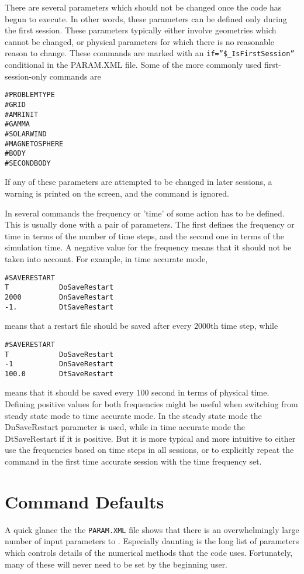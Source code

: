 There are several parameters which should not be changed once the code 
has begun to execute.  
In other words, these parameters can be defined only during the first
session.  These parameters typically either involve geometries which 
cannot be changed, or physical parameters for which there is no reasonable 
reason to change. These commands are marked with an 
{\tt if=''\$\_IsFirstSession''} conditional in the PARAM.XML file.
Some of the more commonly used first-session-only commands are
\begin{verbatim}
#PROBLEMTYPE 
#GRID 
#AMRINIT
#GAMMA
#SOLARWIND
#MAGNETOSPHERE
#BODY
#SECONDBODY
\end{verbatim}
If any of these parameters are attempted to be changed in later sessions, 
a warning is printed on the screen, and the command is ignored.

In several commands the frequency or 'time' of some action has
to be defined. This is usually done with a pair of parameters.
The first defines the frequency or time in terms of the number of time steps,
and the second one in terms of the simulation time.
A negative value for the frequency means that it should not be taken 
into account. For example, in time accurate mode,
\begin{verbatim}
#SAVERESTART
T            DoSaveRestart
2000         DnSaveRestart
-1.          DtSaveRestart
\end{verbatim}
means that a restart file should be saved after every 2000th time step, while
\begin{verbatim}
#SAVERESTART
T            DoSaveRestart
-1           DnSaveRestart
100.0        DtSaveRestart
\end{verbatim}
means that it should be saved every 100 second in terms of physical time.
Defining positive values for both frequencies might be useful
when switching from steady state mode to time accurate mode.
In the steady state mode the DnSaveRestart parameter is used,
while in time accurate mode the DtSaveRestart if it is positive.
But it is more typical and more intuitive to either 
use the frequencies based on time steps in all sessions, 
or to explicitly repeat the command in the first 
time accurate session with the time frequency set.

\section{Command Defaults \label{section:defaults}}

A quick glance the the {\tt PARAM.XML} file shows that there is an 
overwhelmingly large number of input parameters to \BATSRUS.  
Especially daunting is the long
list of parameters which controls details of the numerical methods that the
code uses.  Fortunately, many of these will never need to be set by the 
beginning user.  

